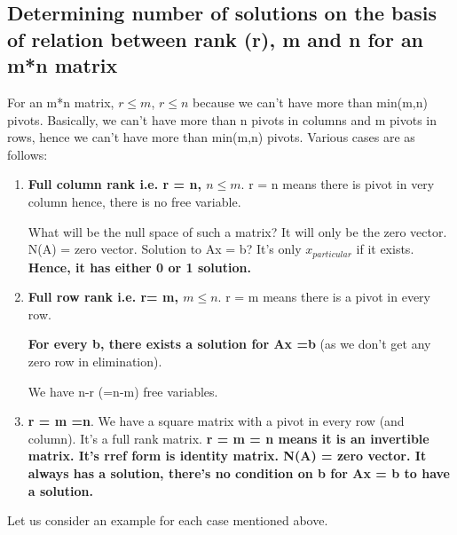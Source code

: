\documentclass{article}
\begin{document}
\subsection{Determining number of solutions on the basis of relation between rank (r), m and n for an m*n matrix}
For an m*n matrix, $r \leq m$, $r \leq n$ because we can't have more than min(m,n) pivots. Basically, we can't have more than n pivots in  columns and m pivots in rows, hence we can't have more than min(m,n) pivots. \newline
Various cases are as follows:

\begin{enumerate}
    \item \textbf{Full column rank i.e. r = n, $n \leq m$}. r = n means there is pivot in very column hence, there is no free variable. \newline
    
    What will be the null space of such a matrix?
    It will only be the zero vector. N(A) = zero vector.
    \newline
    Solution to Ax = b? It's only $x_{particular}$ if it exists. 
    \textbf{Hence, it has either 0 or 1 solution.}
    
    \item \textbf{Full row rank i.e. r= m, $m \leq n$}. r = m means there is a pivot in every row. \newline
    
     \textbf{For every b, there exists a solution for Ax =b} (as we don't get any zero row in elimination).
     
     We have n-r (=n-m) free variables. 
    
    \item \textbf{r = m =n}. We have a square matrix with a pivot in every row (and column). It's a full rank matrix. \textbf{r = m = n means it is an invertible matrix. It's rref form is identity matrix. N(A) = zero vector. It always has a solution, there's no condition on b for Ax = b to have a solution.}
    
\end{enumerate}

Let us consider an example for each case mentioned above.
\end{document}
